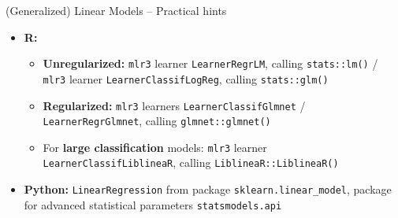 \begin{frame}{(Generalized) Linear Models -- Practical hints}


\begin{itemize}
  \item \textbf{R:}
  \begin{itemize}
    \item \textbf{Unregularized:} \texttt{mlr3} learner \texttt{LearnerRegrLM}, 
    calling \texttt{stats::lm()} / \texttt{mlr3} learner 
    \texttt{LearnerClassifLogReg}, calling \texttt{stats::glm()}
    \item \textbf{Regularized:} \texttt{mlr3} learners 
    \texttt{LearnerClassifGlmnet} / 
    \texttt{LearnerRegrGlmnet}, calling \texttt{glmnet::glmnet()}
    \item For \textbf{large classification} models: \texttt{mlr3} learner     
    \texttt{LearnerClassifLiblineaR}, calling \texttt{LiblineaR::LiblineaR()}
  \end{itemize}
  \item \textbf{Python:} \texttt{LinearRegression} from package 
  \texttt{sklearn.linear\_model}, package for advanced statistical parameters 
  \texttt{statsmodels.api} 
\end{itemize}


\end{frame}



